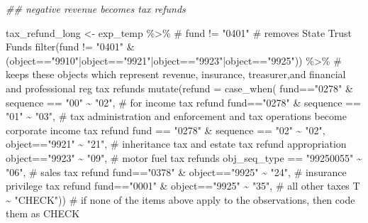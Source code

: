 \documentclass[
  letterpaper,
  DIV=11,
  numbers=noendperiod]{scrreport}
\newenvironment{Shaded}{\begin{snugshade}}{\end{snugshade}}
\newcommand{\AttributeTok}[1]{\textcolor[rgb]{0.40,0.45,0.13}{#1}}
\newcommand{\CommentTok}[1]{\textcolor[rgb]{0.37,0.37,0.37}{#1}}
\newcommand{\DocumentationTok}[1]{\textcolor[rgb]{0.37,0.37,0.37}{\textit{#1}}}
\newcommand{\FunctionTok}[1]{\textcolor[rgb]{0.28,0.35,0.67}{#1}}
\newcommand{\NormalTok}[1]{\textcolor[rgb]{0.00,0.23,0.31}{#1}}
\newcommand{\OtherTok}[1]{\textcolor[rgb]{0.00,0.23,0.31}{#1}}
\newcommand{\SpecialCharTok}[1]{\textcolor[rgb]{0.37,0.37,0.37}{#1}}
\newcommand{\StringTok}[1]{\textcolor[rgb]{0.13,0.47,0.30}{#1}}
\begin{document}
\begin{Shaded}
\begin{Highlighting}[]
\DocumentationTok{\#\# negative revenue becomes tax refunds}

\NormalTok{tax\_refund\_long }\OtherTok{\textless{}{-}}\NormalTok{ exp\_temp }\SpecialCharTok{\%\textgreater{}\%}           \CommentTok{\# fund != "0401" \# removes State Trust Funds}
  \FunctionTok{filter}\NormalTok{(fund }\SpecialCharTok{!=} \StringTok{"0401"} \SpecialCharTok{\&}\NormalTok{ (object}\SpecialCharTok{==}\StringTok{"9910"}\SpecialCharTok{|}\NormalTok{object}\SpecialCharTok{==}\StringTok{"9921"}\SpecialCharTok{|}\NormalTok{object}\SpecialCharTok{==}\StringTok{"9923"}\SpecialCharTok{|}\NormalTok{object}\SpecialCharTok{==}\StringTok{"9925"}\NormalTok{)) }\SpecialCharTok{\%\textgreater{}\%}
  \CommentTok{\# keeps these objects which represent revenue, insurance, treasurer,and financial and professional reg tax refunds}
  \FunctionTok{mutate}\NormalTok{(}\AttributeTok{refund =} \FunctionTok{case\_when}\NormalTok{(}
\NormalTok{    fund}\SpecialCharTok{==}\StringTok{"0278"} \SpecialCharTok{\&}\NormalTok{ sequence }\SpecialCharTok{==} \StringTok{"00"} \SpecialCharTok{\textasciitilde{}} \StringTok{"02"}\NormalTok{, }\CommentTok{\# for income tax refund}
\NormalTok{    fund}\SpecialCharTok{==}\StringTok{"0278"} \SpecialCharTok{\&}\NormalTok{ sequence }\SpecialCharTok{==} \StringTok{"01"} \SpecialCharTok{\textasciitilde{}} \StringTok{"03"}\NormalTok{, }\CommentTok{\# tax administration and enforcement and tax operations become corporate income tax refund}
\NormalTok{     fund }\SpecialCharTok{==} \StringTok{"0278"} \SpecialCharTok{\&}\NormalTok{ sequence }\SpecialCharTok{==} \StringTok{"02"} \SpecialCharTok{\textasciitilde{}} \StringTok{"02"}\NormalTok{,}
\NormalTok{    object}\SpecialCharTok{==}\StringTok{"9921"} \SpecialCharTok{\textasciitilde{}} \StringTok{"21"}\NormalTok{,                }\CommentTok{\# inheritance tax and estate tax refund appropriation}
\NormalTok{    object}\SpecialCharTok{==}\StringTok{"9923"} \SpecialCharTok{\textasciitilde{}} \StringTok{"09"}\NormalTok{,                }\CommentTok{\# motor fuel tax refunds}
\NormalTok{    obj\_seq\_type }\SpecialCharTok{==} \StringTok{"99250055"} \SpecialCharTok{\textasciitilde{}} \StringTok{"06"}\NormalTok{,    }\CommentTok{\# sales tax refund}
\NormalTok{    fund}\SpecialCharTok{==}\StringTok{"0378"} \SpecialCharTok{\&}\NormalTok{ object}\SpecialCharTok{==}\StringTok{"9925"} \SpecialCharTok{\textasciitilde{}} \StringTok{"24"}\NormalTok{, }\CommentTok{\# insurance privilege tax refund}
\NormalTok{    fund}\SpecialCharTok{==}\StringTok{"0001"} \SpecialCharTok{\&}\NormalTok{ object}\SpecialCharTok{==}\StringTok{"9925"} \SpecialCharTok{\textasciitilde{}} \StringTok{"35"}\NormalTok{, }\CommentTok{\# all other taxes}
\NormalTok{      T }\SpecialCharTok{\textasciitilde{}} \StringTok{"CHECK"}\NormalTok{))                       }\CommentTok{\# if none of the items above apply to the observations, then code them as CHECK }


\end{Highlighting}
\end{Shaded}
\end{document}
